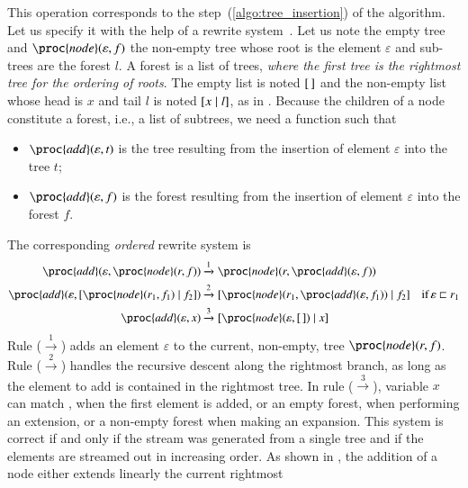 This operation corresponds to the step~(\ref{algo:tree_insertion}) of
the algorithm. Let us specify it with the help of a rewrite
system~\cite{HTCS:1990}. Let us note  the empty \XML tree
and \(\proc{node}(\varepsilon, f)\) the non\hyp{}empty tree whose root
is the element \(\varepsilon\) and sub\hyp{}trees are the forest
\(l\). A forest is a list of trees, \emph{where the first tree is the
  rightmost tree for the ordering of roots}. The empty list is noted
\([\,]\) and the non-empty list whose head is \(x\) and tail \(l\) is
noted \([{x}\mid{l}]\), as in \Prolog. Because the children of a node
constitute a forest, i.e., a list of subtrees, we need a function
 such that
\begin{itemize}
 
  \item \(\proc{add}(\varepsilon, t)\) is the \XML tree resulting from
    the insertion of element \(\varepsilon\) into the \XML tree \(t\);

  \item \(\proc{add}(\varepsilon, f)\) is the \XML forest resulting
    from the insertion of element \(\varepsilon\) into the \XML forest
    \(f\).

\end{itemize}
The corresponding \emph{ordered} rewrite system is
\begin{align*}
  \proc{add}(\varepsilon, \proc{node}(r, f))
& \xrightarrow{1} \proc{node}(r, \proc{add}(\varepsilon, f))\\
  \proc{add}(\varepsilon, \cons{\proc{node}(r_1, f_1)}{f_2})
& \xrightarrow{2}
  \cons{\proc{node}(r_1, \proc{add}(\varepsilon, f_1))}{f_2}
& \text{if} \, \varepsilon \sqsubset r_1\\
  \proc{add}(\varepsilon, x)
& \xrightarrow{3}
  \cons{\proc{node}(\varepsilon, \el)}{x}
\end{align*}
Rule (\(\xrightarrow{1}\)) adds an element \(\varepsilon\) to the
current, non\hyp{}empty, \XML tree \(\proc{node}(r, f)\). Rule
(\(\xrightarrow{2}\)) handles the recursive descent along the
rightmost branch, as long as the element to add is contained in the
rightmost tree. In rule (\(\xrightarrow{3}\)), variable \(x\) can
match , when the first element is added, or an empty
forest, when performing an extension, or a non\hyp{}empty forest when
making an expansion. This system is correct if and only if the stream
was generated from a single \XML tree and if the elements are streamed
out in increasing order. As shown in ,
the addition of a node either extends linearly the current rightmost
